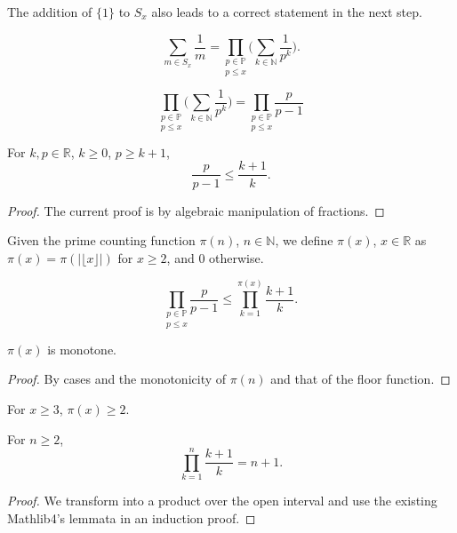 The addition of $\{1\}$ to $S_x$ also leads to a correct statement in the next step.

\begin{lemma}
\label{lem:lemma2}
\leanok
    $$\sum_{m\in S_x}\frac{1}{m} = \underset{p\le x}{\prod_{p\in\mathbb{P}}}\Big(\sum_{k\in\mathbb{N}}\frac{1}{p^k}\Big).$$
\end{lemma}

\begin{lemma}
\label{lem:lemma3}
\leanok
    $$\underset{p\le x}{\prod_{p\in\mathbb{P}}}\Big(\sum_{k\in\mathbb{N}}\frac{1}{p^k}\Big) = \underset{p\le x}{\prod_{p\in\mathbb{P}}}\frac{p}{p-1}$$
\end{lemma}

\begin{lemma}
\label{lem:lemma4-1}
\leanok
For $k,p \in\mathbb{R}$, $k\ge0$, $p \ge k+1$,
$$\frac{p}{p-1} \le \frac{k+1}{k}.$$
\end{lemma}
\begin{proof}
\leanok
The current proof is by algebraic manipulation of fractions.
\end{proof}

\begin{definition-pre}
\label{def:piReal}
Given the prime counting function $\pi(n)$, $n\in\mathbb{N}$, we define $\pi(x)$, $x\in\mathbb{R}$ as $\pi(x) = \pi(|\lfloor x\rfloor|)$ for $x\ge2$, and $0$ otherwise.
\end{definition-pre}

\begin{lemma}
\label{lem:lemma4}
$$\underset{p\le x}{\prod_{p\in\mathbb{P}}}\frac{p}{p-1} \le \prod_{k=1}^{\pi(x)}\frac{k+1}{k}.$$
\end{lemma}

\begin{lemma}
\label{lem:lemma5-2-1}
\leanok
$\pi(x)$ is monotone.
\end{lemma}
\begin{proof}
\leanok
By cases and the monotonicity of $\pi(n)$ and that of the floor function.
\end{proof}

\begin{lemma}
\label{lem:lemma5-2}
\leanok
For $x\ge3$, $\pi(x)\ge2$.
\end{lemma}

\begin{lemma}
\label{lem:lemma5-1}
\leanok
For $n\ge2$,
    $$\prod_{k=1}^{n}\frac{k+1}{k} = n+1.$$
\end{lemma}
\begin{proof}
\leanok
We transform into a product over the open interval and use the existing Mathlib4's lemmata in an induction proof.
\end{proof}


